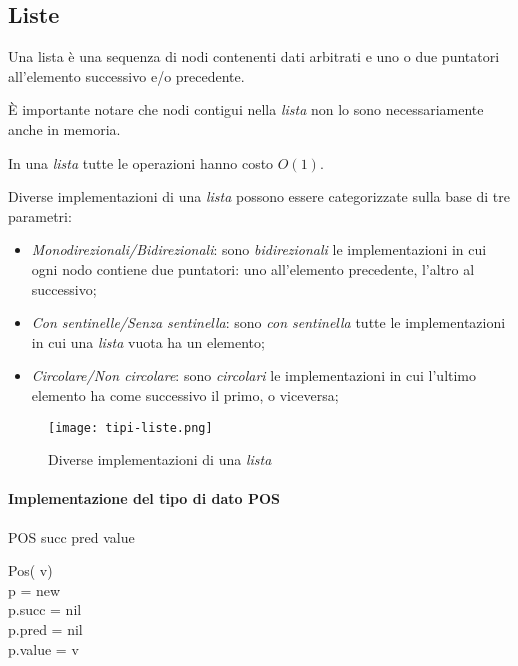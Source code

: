 \subsection{Liste}
\begin{definition}[Lista]
    Una lista è una sequenza di nodi contenenti dati arbitrati e uno o due
    puntatori all'elemento successivo e/o precedente.
\end{definition}
\begin{note}
    È importante notare che nodi contigui nella \emph{lista} non lo sono
    necessariamente anche in memoria.
\end{note}
\begin{note}
    In una \emph{lista} tutte le operazioni hanno costo $O(1)$.
\end{note}\noindent
Diverse implementazioni di una \emph{lista} possono essere categorizzate sulla
base di tre parametri:
\begin{itemize}
    \item \emph{Monodirezionali/Bidirezionali}: sono \emph{bidirezionali} le
    implementazioni in cui ogni nodo contiene due puntatori: uno all'elemento
    precedente, l'altro al successivo;
    \item \emph{Con sentinelle/Senza sentinella}: sono \emph{con sentinella}
    tutte le implementazioni in cui una \emph{lista} vuota ha un elemento;
    \item \emph{Circolare/Non circolare}: sono \emph{circolari} le
    implementazioni in cui l'ultimo elemento ha come successivo il primo, o
    viceversa;
\end{itemize}

\begin{figure}[ht]
    \centering
    \texttt{[image: tipi-liste.png]}
    \caption{Diverse implementazioni di una \emph{lista}}
\end{figure}

\paragraph{Implementazione del tipo di dato POS}
\begin{code}{POS}
     succ\hfill{}
     pred\hfill{}
     value\hfill{}
    
    \ind{} Pos( v)\\
         p = new \\
        p.succ = nil\\
        p.pred = nil\\
        p.value = v
\end{code}

